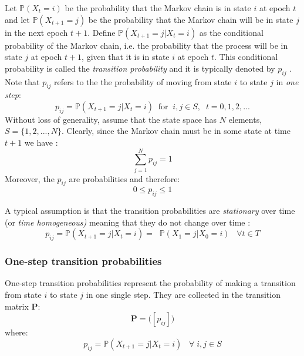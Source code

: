 Let $\mathds{P}(X_t = i)$ be the probability that the Markov chain is in state $i$ at epoch $t$ and let $\mathds{P}(X_{t+1} = j)$ be the probability that the Markov chain will be in state $j$ in the next epoch $t+1$. Define $\mathds{P}(X_{t+1}
= j|X_{t} = i)$ as the conditional probability of the Markov chain, i.e. the probability that the process will be in state $j$ at epoch $t + 1$, given that it is in state $i$ at epoch $t$. 
This conditional probability is called the \textit{transition probability} and it is typically denoted by $p_{ij}$ \citep{Sheskin2010}. Note that $p_{ij}$  refers to the the probability of moving from state $i$ to state $j$ in \textit{one step}:
\begin{equation}
    p_{ij} = \mathds{P}(X_{t+1} = j |X_t = i) \; \; \text{for}\; \; i,j \in S, \; \; t=0,1,2,...
\end{equation}
Without loss of generality, assume that the state space has $N$ elements, $S=\{1,2,...,N\} $. Clearly, since the Markov chain must be in some state at time $t+1$ we have \citep{Howard1960}:
\begin{equation}
 \sum_{j=1}^N     p_{ij} = 1
\end{equation}
 Moreover, the $p_{ij}$ are probabilities and therefore:
\begin{equation}
 0 \leq p_{ij} \leq 1
\end{equation}

A typical assumption is that the transition probabilities are \textit{stationary} over time (or \textit{time homogeneous)} meaning that they do not change over time \citep{Sheskin2010}:
\begin{equation}
    p_{ij} = \mathds{P}(X_{t+1} = j |X_t = i)  = \; \; \mathds{P}(X_{1} = j |X_0 = i) \;\;\; \forall t \in T
\end{equation}

\subsubsection{One-step transition probabilities}
\noindent One-step transition probabilities represent the probability of making a transition from state $i$ to state $j$ in one single step. They are collected in the transition matrix $\mathbf{P}$:
\begin{equation}
   \mathbf{P} = \Big([ p_{ij}] \Big)
\end{equation}
where:
\begin{equation}
    p_{ij} = \mathds{P} ( X_{t+1} = j | X_t = i) \;\;\; \forall \; i,j \in S
\end{equation}

